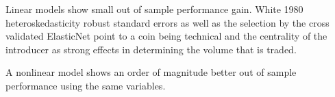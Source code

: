 Linear models show small out of sample performance gain. 
White 1980 heteroskedasticity robust standard errors as well as the selection by the cross validated ElasticNet point to a coin being technical and the centrality of the introducer as strong effects in determining the volume that is traded.

A nonlinear model shows an order of magnitude better out of sample performance using the same variables. 
